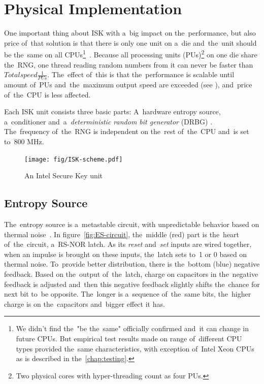 \section{Physical Implementation}\label{sec:ISK-physical}
\par{
One important thing about ISK with a~big impact on the~performance, but also price 
of~that solution is that there is only one unit on a~die and~the~unit should be
 the~same on all CPUs\footnote{We didn't find the~"be the~same" officially confirmed and~it can change in future CPUs. But empirical test results made on range of~different CPU types provided the~same characteristics, with exception of~Intel Xeon CPUs as is described in the~\ref{chap:testing}.}~\cite[Chapter. 3.1]{IntelDRNGGuide}.
Because all processing units (PUs)\footnote{Two physical cores with 
hyper-threading count as four PUs.} on one die share the~RNG, one thread 
reading random numbers from it can never be faster than 
$Total speed  \frac{1}{PUs}$. The~effect of~this is that the~performance is
 scalable until amount of~PUs and~the~maximum output speed are exceeded 
 (see ), and~price of~the~CPU is less 
 affected.
}

\par{
Each ISK unit consists three basic parts: A~hardware entropy source, 
a~conditioner and~a~{\em deterministic random bit generator} (DRBG)
\cite{IntelDRNGGuide}. The~frequency of~the~RNG is independent 
on the~rest of~the~CPU and~is set to~800 MHz. 
}
\begin{figure}[h!]
  \centering
 \texttt{[image: fig/ISK-scheme.pdf]} %
\caption{An Intel Secure Key unit}
\label{fig:ISK-unit}
\end{figure}


\subsection{Entropy Source}
\par{
The~entropy source is a~metastable circuit, with unpredictable behavior based 
on thermal noise~\cite{UnderstandingRdRandElectronic}.
In figure~\ref{fig:ES-circuit}, the~middle (red) part is the~heart 
of~the~circuit, a~RS-NOR latch. As its {\em reset} and~{\em set} inputs 
are wired together, when an impulse is brought on these inputs, the~latch sets 
to~1 or 0 based on thermal noise. To~provide better distribution, there is 
the~bottom (blue) negative feedback. Based on the~output of~the~latch, charge 
on capacitors in the~negative feedback is adjusted and~then this negative 
feedback slightly shifts the~chance for next bit to~be opposite. The~longer 
is a~sequence of~the~same bits, the~higher charge is on the~capacitors 
and~bigger effect it has.
}

